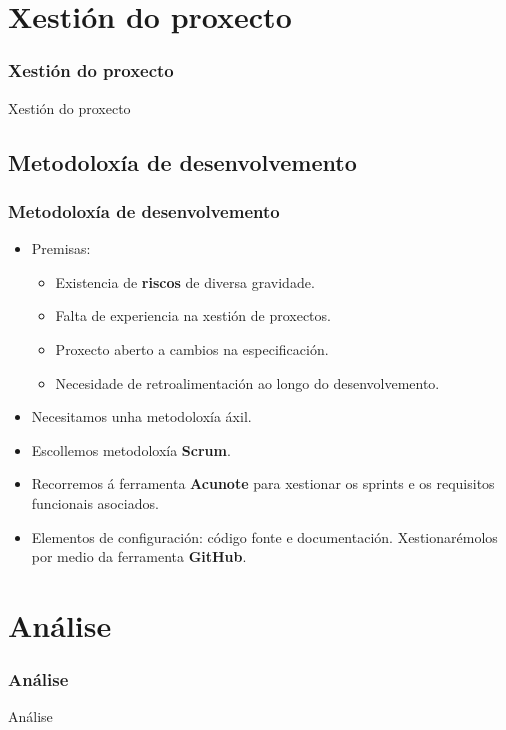 \documentclass{beamer}
\begin{document}
\section{Xestión do proxecto} 

\begin{frame}
\frametitle{Xestión do proxecto} 
Xestión do proxecto
\end{frame}

\subsection{Metodoloxía de desenvolvemento}
\begin{frame}
\frametitle{Metodoloxía de desenvolvemento} 
\begin{itemize}
\item Premisas:
\begin{itemize}
\item Existencia de \textbf{riscos} de diversa gravidade.
\item Falta de experiencia na xestión de proxectos.
\item Proxecto aberto a cambios na especificación.
\item Necesidade de retroalimentación ao longo do desenvolvemento.
\end{itemize} 
\item Necesitamos unha metodoloxía áxil.
\item Escollemos metodoloxía \textbf{Scrum}.
\item Recorremos á ferramenta \textbf{Acunote} para xestionar os sprints e os requisitos funcionais asociados.
\item Elementos de configuración: código fonte e documentación. Xestionarémolos por medio da ferramenta \textbf{GitHub}.
\end{itemize} 
\end{frame}


\section{Análise}
\begin{frame}
\frametitle{Análise} 
Análise
\end{frame}
\end{document}
